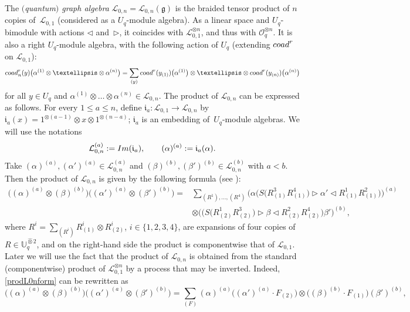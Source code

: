 \documentclass[11pt]{article}
\numberwithin{equation}{section}
\numberwithin{equation}{section}
\theoremstyle{definition}
\newcommand{\mUq}{\mathbb{U}_q}
\newcommand{\Ll}{{\mathcal L}}
\newcommand{\Oo}{{\mathcal O}}
\newcommand{\ra}{\rightarrow}
\begin{document}
The {\it $($quantum$)$ graph algebra} $\Ll_{0,n} = \Ll_{0,n}(\mathfrak{g})$ is the braided tensor product of $n$ copies of~$\Ll_{0,1}$ (considered as a $U_q$-module algebra). As a linear space and $U_q$-bimodule with actions $\lhd$ and~$\rhd$, it coincides with $\Ll_{0,1}^{\otimes n}$, and thus with $\Oo_q^{\otimes n}$. It is also a right $U_q$-module algebra, with the following action of $U_q$ (extending ${\rm coad}^r$ on $\Ll_{0,1}$):
 \begin{gather}
{\rm coad}_n^r(y)\big(\alpha^{(1)}\otimes \dots \otimes \alpha^{(n)}\big) =
\sum_{(y)} {\rm coad}^r(y_{(1)})\big(\alpha^{(1)}\big) \otimes \dots \otimes {\rm coad}^r(y_{(n)})\big(\alpha^{(n)}\big)\label{actionprod}
\end{gather}
for all $y \in U_q$ and $\alpha^{(1)}\otimes \dots \otimes \alpha^{(n)} \in \Ll_{0,n}$. The product of $\Ll_{0,n}$ can be expressed as follows. For every $1\leq a\leq n$, define $\mathfrak{i}_a\colon \Ll_{0,1}\ra \Ll_{0,n}$ by $\mathfrak{i}_a(x) = 1^{\otimes (a-1)}\otimes x \otimes 1^{\otimes (n-a)}$; $\mathfrak{i}_a$ is an embedding of~$U_q$-module algebras. We will use the notations
\begin{equation}\label{plgtL01a}
\Ll_{0,n}^{(a)}:= {\rm Im}(\mathfrak{i}_a),\qquad (\alpha)^{(a)} := \mathfrak{i}_a(\alpha).
\end{equation}
Take $(\alpha)^{(a)},(\alpha')^{(a)} \in \Ll_{0,n}^{(a)}$ and $(\beta)^{(b)},(\beta')^{(b)} \in \Ll_{0,n}^{(b)}$ with $a<b$. Then the product of $\Ll_{0,n}$ is given by the following formula (see \cite[Section 6]{BR}):
\begin{align}
\big((\alpha)^{(a)}\otimes (\beta)^{(b)}\big) \big((\alpha')^{(a)} \otimes (\beta')^{(b)}\big) ={}& \sum_{(R^1),\dots, (R^4)} \big(\alpha \big(S\big(R^3_{(1)}R^4_{(1)}\big)\rhd \alpha' \lhd R^1_{(1)}R^2_{(1)}\big)\big)^{(a)}\nonumber\\
 &
\otimes \big( \big( S\big(R^1_{(2)}R^3_{(2)}\big) \rhd \beta \lhd R^2_{(2)}R^4_{(2)}\big)\beta'\big)^{(b)},\label{prodL0nform}
\end{align}
where $R^i = \sum_{(R^i)}R_{(1)}^i\otimes R_{(2)}^i$, $i\in \{1,2,3,4\}$, are expansions of four copies of $R\in \mUq^{\hat \otimes 2}$, and on the right-hand side the product is componentwise that of $\Ll_{0,1}$. Later we will use the fact that the product of $\Ll_{0,n}$ is obtained from the standard (componentwise) product of $\Ll_{0,1}^{\otimes n}$ by a process that may be inverted. Indeed, \eqref{prodL0nform} can be rewritten as
\begin{equation}\label{prodL0nform2}
\big((\alpha)^{(a)}\otimes (\beta)^{(b)}\big) \big((\alpha')^{(a)} \otimes (\beta')^{(b)}\big) = \sum_{(F)} (\alpha)^{(a)}\big((\alpha')^{(a)}\cdot F_{(2)}\big)\otimes \big((\beta)^{(b)}\cdot F_{(1)}\big)(\beta')^{(b)},
\end{equation}
\end{document}
